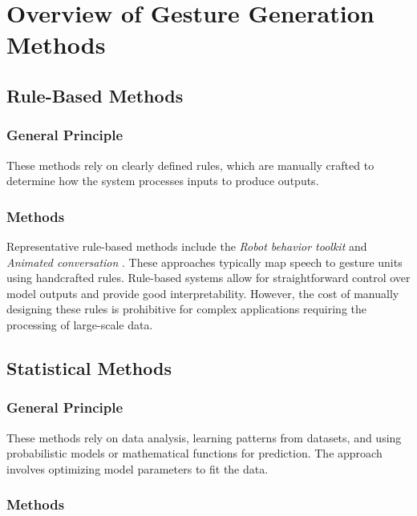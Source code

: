 \section{Overview of Gesture Generation Methods}
\label{sec:relatedwork}

\subsection{Rule-Based Methods}

\subsubsection{General Principle}

These methods rely on clearly defined rules, which are manually crafted to determine how the system processes inputs to produce outputs.

\subsubsection{Methods}

Representative rule-based methods include the \textit{Robot behavior toolkit} \cite{huang2012robot} and \textit{Animated conversation} \cite{cassell1994animated}. These approaches typically map speech to gesture units using handcrafted rules. Rule-based systems allow for straightforward control over model outputs and provide good interpretability.  
However, the cost of manually designing these rules is prohibitive for complex applications requiring the processing of large-scale data.

\subsection{Statistical Methods}

\subsubsection{General Principle}

These methods rely on data analysis, learning patterns from datasets, and using probabilistic models or mathematical functions for prediction. The approach involves optimizing model parameters to fit the data.

\subsubsection{Methods}

